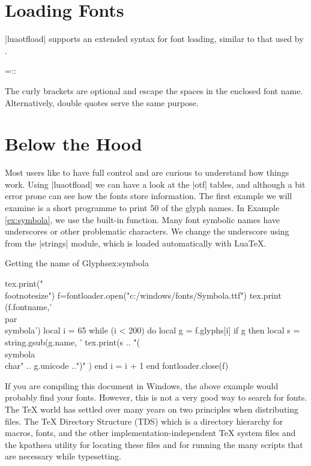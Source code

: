 {\section{Loading Fonts}

|luaotfload| supports an extended syntax for font loading, similar to that used by \xetex.



\noindent{}=::

The curly brackets are optional and escape the spaces in the enclosed
font name. Alternatively, double quotes serve the same purpose.

\section{Below the Hood}

Most \tex users like to have full control and are curious to understand how things work. Using |luaotfload| we can have a look at the |otf| tables, and although a bit error prone can 
see how the fonts store information. The first example we will examine is a short programme to print 50 of the glyph names. In Example \ref{ex:symbola}, we use the built-in   function. Many font symbolic names have underscores or other problematic characters. We change the underscore using  from the |strings| module, which is loaded automatically with LuaTeX.


\begin{texexample}{Getting the name of Glyphs}{ex:symbola}
\bgroup
\begin{luacode}
tex.print("\\footnotesize")
f=fontloader.open("c:/windows/fonts/Symbola.ttf")
tex.print (f.fontname,'\\par\\symbola')
local i = 65
while (i < 200) do  
local g = f.glyphs[i]
if g then
  local s = string.gsub(g.name, '%
  tex.print(s .. "(\\symbola\\char" .. g.unicode ..")" )
end
  i = i + 1
end
fontloader.close(f)
\end{luacode}
\egroup
\end{texexample}

If you are compiling this document in Windows, the above example would probably find your fonts. However, this is not a very good way to search for fonts. The TeX world has settled over many years on two principles when distributing files. The TeX Directory Structure (TDS) which is a directory hierarchy for macros, fonts, and the other implementation-independent TeX system files and the kpathsea utility for locating these files and for running the many scripts that are necessary while typesetting.

}
